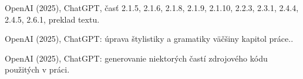 \begin{trivlist}
\item OpenAI (2025), ChatGPT, časť 2.1.5, 2.1.6, 2.1.8, 2.1.9, 2.1.10, 2.2.3, 2.3.1, 2.4.4, 2.4.5, 2.6.1, preklad textu.

\item OpenAI (2025), ChatGPT: úprava štylistiky a gramatiky väčšiny kapitol práce..

\item OpenAI (2025), ChatGPT: generovanie niektorých častí zdrojového kódu použitých v práci.

\end{trivlist}
